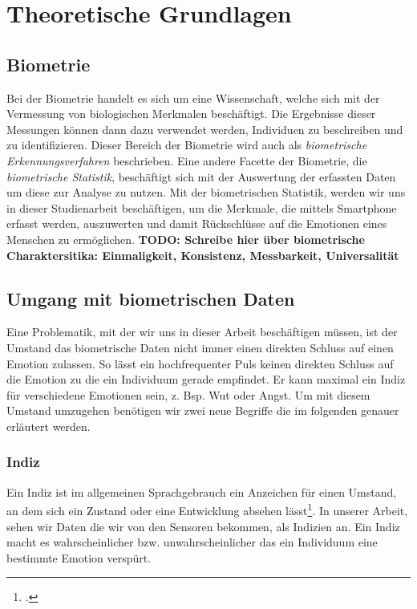\section{Theoretische Grundlagen}
\subsection{Biometrie}
Bei der Biometrie handelt es sich um eine Wissenschaft, welche sich mit der Vermessung von biologischen Merkmalen beschäftigt.\newline
Die Ergebnisse dieser Messungen können dann dazu verwendet werden, Individuen zu beschreiben und zu identifizieren. Dieser Bereich 
der Biometrie wird auch als \textit{biometrische Erkennungsverfahren} beschrieben. Eine andere Facette der Biometrie, die \textit{biometrische Statistik},
beschäftigt sich mit der Auswertung der erfassten Daten um diese zur Analyse zu nutzen.\newline
Mit der biometrischen Statistik, werden wir uns in dieser Studienarbeit beschäftigen, um die Merkmale, die mittels 
Smartphone erfasst werden, auszuwerten und damit Rückschlüsse auf die Emotionen eines Menschen zu ermöglichen.
\textbf{TODO: Schreibe hier über biometrische Charaktersitika: Einmaligkeit, Konsistenz, Messbarkeit, Universalität}
\subsection{Umgang mit biometrischen Daten}
Eine Problematik, mit der wir uns in dieser Arbeit beschäftigen müssen, ist der Umstand das biometrische Daten nicht immer einen direkten Schluss auf einen Emotion zulassen. So lässt ein hochfrequenter Puls keinen direkten Schluss auf die Emotion zu die ein Individuum gerade empfindet. Er kann maximal ein Indiz für verschiedene Emotionen sein, z. Bsp. Wut oder Angst. Um mit diesem Umstand umzugehen benötigen wir zwei neue Begriffe die im folgenden genauer erläutert werden. 
\subsubsection{Indiz}
Ein Indiz ist im allgemeinen Sprachgebrauch ein Anzeichen für einen Umstand, an dem sich ein Zustand oder eine Entwicklung absehen lässt\footcite[Vgl.][]{Dud18}. In unserer Arbeit, sehen wir Daten die wir von den Sensoren bekommen, als Indizien an. Ein Indiz macht es wahrscheinlicher bzw. unwahrscheinlicher das ein Individuum eine bestimmte Emotion verspürt. 
